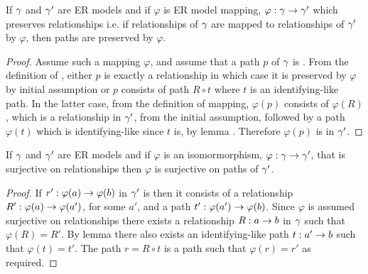 \begin{lemma}
If $\gamma$ and $\gamma'$ are ER models and  if  $\varphi$ is ER model mapping, $\varphi: \gamma \rightarrow \gamma'$  which preserves relationships  i.e. if relationships of $\gamma$ are mapped to relationships of $\gamma'$ by  $\varphi$, then  paths are preserved by $\varphi$.
\end{lemma}
\begin{proof}
Assume such a mapping $\varphi$, and assume that a path $p$ of $\gamma$ is .
From the definition of , either $p$ is exactly a relationship in which case it is preserved by $\varphi$ by initial assumption or $p$ consists of path $R \circ t$ where $t$ is an identifying-like path.
In the latter case, from the definition of mapping, $\varphi(p)$ consists of $\varphi(R)$, which is a relationship in $\gamma'$, from the initial assumption, followed by a path $\varphi(t)$ which is identifying-like since $t$ is, by lemma . Therefore $\varphi(p)$ is  in $\gamma'$.
\end{proof}

\begin{lemma}
If $\gamma$ and $\gamma'$ are ER models and  if  $\varphi$ is an isomormorphism, $\varphi: \gamma \rightarrow \gamma'$, that is surjective on relationships    
then $\varphi$ is surjective on  paths of $\gamma'$. 
\end{lemma}
\begin{proof}
If $r':\varphi(a) \rightarrow \varphi(b)$ in $\gamma'$ is  then it consists of a relationship $R': \varphi(a) \rightarrow \varphi(a')$, for some $a'$,
and a path $t':\varphi(a') \rightarrow \varphi(b)$. Since $\varphi$ is assumed surjective on relationships there exists a relationship 
$R:a \rightarrow b$ in $\gamma$ such that $\varphi(R)=R'$. 
By lemma  there also exists an identifying-like path $t:a' \rightarrow b$ such that $\varphi(t)=t'$.
The path $r=R \circ t$ is a  path such that $\varphi(r)=r'$ as required.
\end{proof}

 

